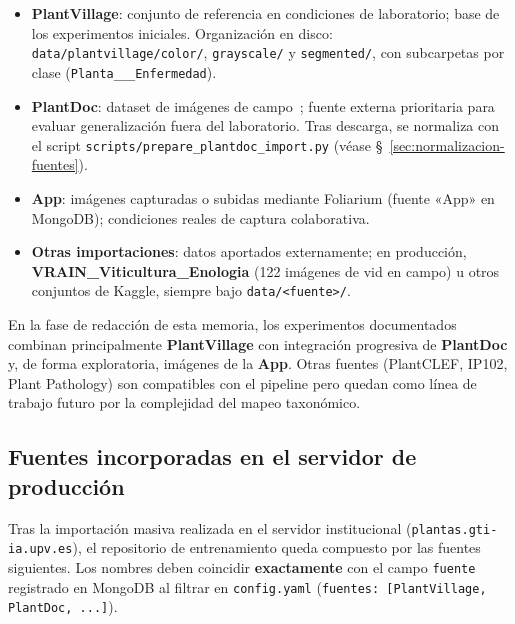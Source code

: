 \documentclass[11pt,spanish,listoffigures,listoftables]{tfgetsinf}
\begin{document}
\begin{itemize}
    \item \textbf{PlantVillage}: conjunto de referencia en condiciones de laboratorio; base de los experimentos iniciales. Organización en disco: \texttt{data/plantvillage/color/}, \texttt{grayscale/} y \texttt{segmented/}, con subcarpetas por clase (\texttt{Planta\_\_\_Enfermedad}).
    \item \textbf{PlantDoc}: dataset de imágenes de campo~\cite{plantdoc2020}; fuente externa prioritaria para evaluar generalización fuera del laboratorio. Tras descarga, se normaliza con el script \texttt{scripts/prepare\_plantdoc\_import.py} (véase §~\ref{sec:normalizacion-fuentes}).
    \item \textbf{App}: imágenes capturadas o subidas mediante Foliarium (fuente «App» en MongoDB); condiciones reales de captura colaborativa.
    \item \textbf{Otras importaciones}: datos aportados externamente; en producción, \textbf{VRAIN\_Viticultura\_Enologia} (122 imágenes de vid en campo) u otros conjuntos de Kaggle, siempre bajo \texttt{data/<fuente>/}.
\end{itemize}

En la fase de redacción de esta memoria, los experimentos documentados combinan principalmente \textbf{PlantVillage} con integración progresiva de \textbf{PlantDoc} y, de forma exploratoria, imágenes de la \textbf{App}. Otras fuentes (PlantCLEF, IP102, Plant Pathology) son compatibles con el pipeline pero quedan como línea de trabajo futuro por la complejidad del mapeo taxonómico.

\subsection{Fuentes incorporadas en el servidor de producción}
\label{sec:fuentes-produccion}

Tras la importación masiva realizada en el servidor institucional (\texttt{plantas.gti-ia.upv.es}), el repositorio de entrenamiento queda compuesto por las fuentes siguientes. Los nombres deben coincidir \textbf{exactamente} con el campo \texttt{fuente} registrado en MongoDB al filtrar en \texttt{config.yaml} (\texttt{fuentes: [PlantVillage, PlantDoc, ...]}).
\end{document}
